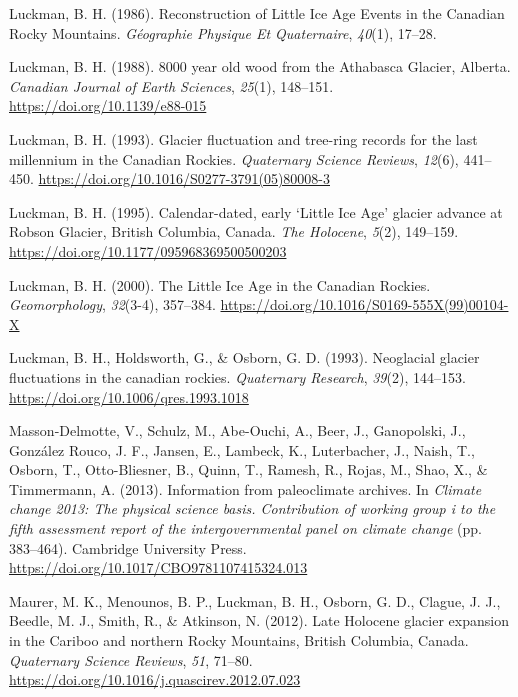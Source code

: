 \documentclass[
  letterpaper,
  DIV=11,
  numbers=noendperiod]{scrartcl}
\newlength{\cslhangindent}
\newenvironment{CSLReferences}[2] %
 {\begin{list}{}{%
  \setlength{\itemindent}{0pt}
  \setlength{\leftmargin}{0pt}
  \setlength{\parsep}{0pt}
  \ifodd #1
   \setlength{\leftmargin}{\cslhangindent}
   \setlength{\itemindent}{-1\cslhangindent}
  \fi
  \setlength{\itemsep}{#2\baselineskip}}}
 {\end{list}}
\begin{document}
\begin{CSLReferences}{1}{0}
Luckman, B. H. (1986). {Reconstruction of Little Ice Age Events in the
Canadian Rocky Mountains}. \emph{G{é}ographie Physique Et Quaternaire},
\emph{40}(1), 17--28.

Luckman, B. H. (1988). {8000 year old wood from the Athabasca Glacier,
Alberta}. \emph{Canadian Journal of Earth Sciences}, \emph{25}(1),
148--151. \url{https://doi.org/10.1139/e88-015}

Luckman, B. H. (1993). {Glacier fluctuation and tree-ring records for
the last millennium in the Canadian Rockies}. \emph{Quaternary Science
Reviews}, \emph{12}(6), 441--450.
\url{https://doi.org/10.1016/S0277-3791(05)80008-3}

Luckman, B. H. (1995). {Calendar-dated, early `Little Ice Age' glacier
advance at Robson Glacier, British Columbia, Canada}. \emph{The
Holocene}, \emph{5}(2), 149--159.
\url{https://doi.org/10.1177/095968369500500203}

Luckman, B. H. (2000). {The Little Ice Age in the Canadian Rockies}.
\emph{Geomorphology}, \emph{32}(3-4), 357--384.
\url{https://doi.org/10.1016/S0169-555X(99)00104-X}

Luckman, B. H., Holdsworth, G., \& Osborn, G. D. (1993). {Neoglacial
glacier fluctuations in the canadian rockies}. \emph{Quaternary
Research}, \emph{39}(2), 144--153.
\url{https://doi.org/10.1006/qres.1993.1018}

Masson-Delmotte, V., Schulz, M., Abe-Ouchi, A., Beer, J., Ganopolski,
J., González Rouco, J. F., Jansen, E., Lambeck, K., Luterbacher, J.,
Naish, T., Osborn, T., Otto-Bliesner, B., Quinn, T., Ramesh, R., Rojas,
M., Shao, X., \& Timmermann, A. (2013). {Information from paleoclimate
archives}. In \emph{Climate change 2013: The physical science basis.
Contribution of working group i to the fifth assessment report of the
intergovernmental panel on climate change} (pp. 383--464). Cambridge
University Press. \url{https://doi.org/10.1017/CBO9781107415324.013}

Maurer, M. K., Menounos, B. P., Luckman, B. H., Osborn, G. D., Clague,
J. J., Beedle, M. J., Smith, R., \& Atkinson, N. (2012). {Late Holocene
glacier expansion in the Cariboo and northern Rocky Mountains, British
Columbia, Canada}. \emph{Quaternary Science Reviews}, \emph{51}, 71--80.
\url{https://doi.org/10.1016/j.quascirev.2012.07.023}


\end{CSLReferences}
\end{document}
